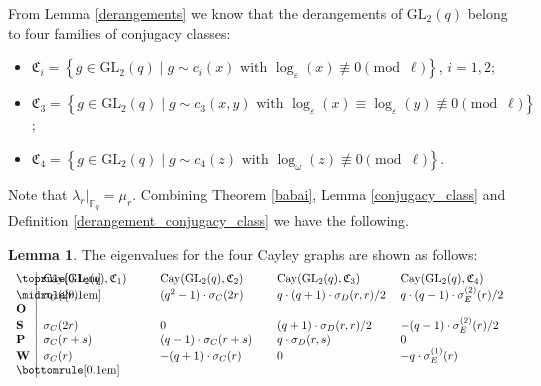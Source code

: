 \documentclass[12pt, reqno]{amsart}
\theoremstyle{definition}
\newtheorem{lemma}[theorem]{Lemma}
\theoremstyle{remark}
\numberwithin{equation}{section}
\newcommand{\BF}{\mathbb{F}}
\newcommand{\cb}[1]{\left\{#1\right\}}
\newcommand{\fC}{\mathfrak{C}}
\newcommand{\GL}{\mathrm{GL}}
\newcommand{\Cay}{\mathrm{Cay}}
\begin{document}
From Lemma \ref{derangements} we know that the derangements of $\GL_2(q)$ belong to four families of conjugacy classes:
\begin{itemize}
	\item $\fC_i = \cb{g \in \GL_2(q) \;|\; g {\sim} c_i(x) \text{ with } \log_\varepsilon(x) \not\equiv 0 \pmod{\ell}}$, $i = 1, 2$;
	
	\item $\fC_3 = \cb{g \in \GL_2(q) \;|\; g {\sim} c_3(x, y) \text{ with }  \log_\varepsilon(x) \equiv \log_\varepsilon(y) \not\equiv 0 \pmod{\ell}}$;
	
	\item $\fC_4 = \cb{g \in \GL_2(q) \;|\; g {\sim} c_4(z) \text{ with }  \log_\omega(z) \not\equiv 0 \pmod{\ell}}$.
\end{itemize}

Note that $\lambda_r|_{\BF_q} = \mu_r$. Combining Theorem \ref{babai}, Lemma \ref{conjugacy_class} and Definition \ref{derangement_conjugacy_class} we have the following.

\begin{lemma}
	The eigenvalues for the four Cayley graphs are shown as follows:
	\[\begin{tabular}{p{0.4cm}|p{3.1cm}p{3.1cm}p{3.3cm}p{3.1cm}}
		\toprule[0.1em]
		
		& $\Cay(\GL_2(q), \fC_1)$ & $\Cay(\GL_2(q), \fC_2)$ & $\Cay(\GL_2(q), \fC_3)$ & $\Cay(\GL_2(q), \fC_4)$ \\
		
		\midrule[0.1em]
		
		\textbf{O} & $\sigma_C(2r)$ & $(q^2 - 1)\cdot\sigma_C(2r)$ & $q\cdot(q + 1)\cdot\sigma_D(r, r)/2$ & $q\cdot(q - 1)\cdot\sigma_E^{(2)}(r)/2$ \\
		
		\textbf{S} & $\sigma_C(2r)$ & $0$ & $(q + 1)\cdot\sigma_D(r, r)/2$ & $-(q - 1)\cdot\sigma_E^{(2)}(r)/2$ \\
		
		\textbf{P} & $\sigma_C(r + s)$ & $(q - 1)\cdot\sigma_C(r + s)$ & $q\cdot\sigma_D(r, s)$ & $0$ \\
		
		\textbf{W} & $\sigma_C(r)$ & $-(q + 1)\cdot\sigma_C(r)$ & $0$ & $-q\cdot\sigma_E^{(1)}(r)$ \\
		
		\bottomrule[0.1em]
	\end{tabular}\]
\end{lemma}
\end{document}
